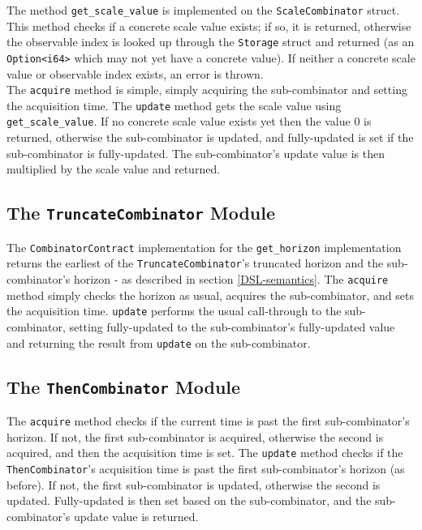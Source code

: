 The method \texttt{get\_scale\_value} is implemented on the \texttt{ScaleCombinator} struct. This method checks if a concrete scale value exists; if so, it is returned, otherwise the observable index is looked up through the \texttt{Storage} struct and returned (as an \texttt{Option<i64>} which may not yet have a concrete value). If neither a concrete scale value or observable index exists, an error is thrown. \\

The \texttt{acquire} method is simple, simply acquiring the sub-combinator and setting the acquisition time. The \texttt{update} method gets the scale value using \texttt{get\_scale\_value}. If no concrete scale value exists yet then the value 0 is returned, otherwise the sub-combinator is updated, and fully-updated is set if the sub-combinator is fully-updated. The sub-combinator's update value is then multiplied by the scale value and returned.


\subsection{The \texttt{TruncateCombinator} Module}

The \texttt{CombinatorContract} implementation for the \texttt{get\_horizon} implementation returns the earliest of the \texttt{TruncateCombinator}'s truncated horizon and the sub-combinator's horizon - as described in section \ref{DSL-semantics}. The \texttt{acquire} method simply checks the horizon as usual, acquires the sub-combinator, and sets the acquisition time. \texttt{update} performs the usual call-through to the sub-combinator, setting fully-updated to the sub-combinator's fully-updated value and returning the result from \texttt{update} on the sub-combinator.


\subsection{The \texttt{ThenCombinator} Module}

The \texttt{acquire} method checks if the current time is past the first sub-combinator's horizon. If not, the first sub-combinator is acquired, otherwise the second is acquired, and then the acquisition time is set. The \texttt{update} method checks if the \texttt{ThenCombinator}'s acquisition time is past the first sub-combinator's horizon (as before). If not, the first sub-combinator is updated, otherwise the second is updated. Fully-updated is then set based on the sub-combinator, and the sub-combinator's update value is returned.


